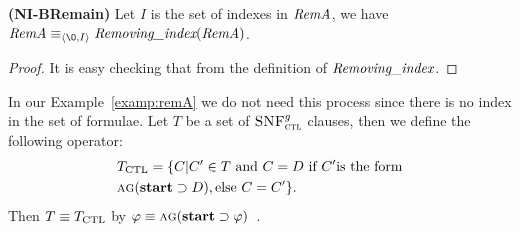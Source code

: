 \documentclass[letterpaper]{article} %
\begin{document}
\begin{lemma}\label{lem:No:Ind}
\textbf{(NI-BRemain)}
Let $I$ is the set of indexes in $\emph{RemA}$,
we have $\emph{RemA}\equiv_{\tuple{{\O}, I}} \emph{Removing\_index}(\emph{RemA})$.
\end{lemma}
\begin{proof}
It is easy checking that from the definition of $\emph{Removing\_index}$.
\end{proof}


In our Example~\ref{examp:remA} we do not need this process since there is no index in the set of formulae.
Let $T$ be a set of ${\textsc{SNF}_{\textsc{ctl}}^g}$ clauses, then we define the following operator:
\begin{align*}
&T_{\textrm{CTL}} = \{C|C'\in T\ \mbox{and}\ C = D \ \mbox{if}\ C' \mbox{is the form}\\
& \textsc{a}\textsc{g}(\textbf{start}\supset D), \mbox{else}\ C= C'\}.
\end{align*}
Then $T \equiv T_{\textrm{CTL}}$ by $\varphi \equiv \textsc{a} \textsc{g} (\textbf{start} \supset \varphi)$~\cite{bolotov2000clausal}.
\end{document}
